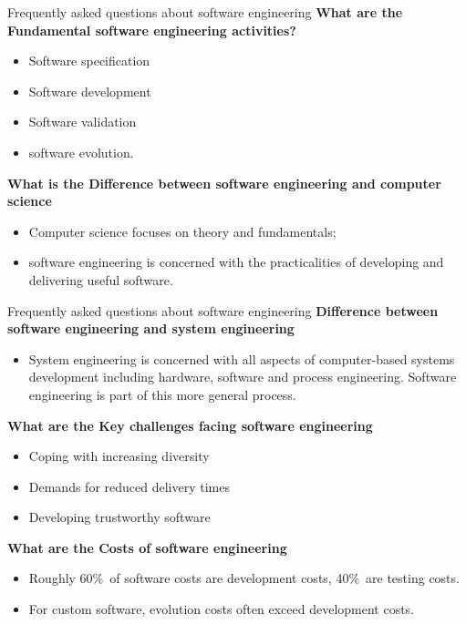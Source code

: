 \documentclass{beamer}
\begin{document}
\begin{frame}{Frequently 
		asked questions about 
		software engineering}
\textbf{What are the Fundamental software 
	engineering activities?}
\begin{itemize}
	\item Software specification
	\item Software development 
	\item Software validation 
	\item software evolution.
\end{itemize}
\textbf{What is the Difference between software 
	engineering and computer science}
\begin{itemize}
	\item Computer science focuses on theory and 
	fundamentals; 
	\item software engineering is 
	concerned with the practicalities of 
	developing and delivering useful 
	software.
\end{itemize}
\end{frame}
\begin{frame}{Frequently 
		asked questions about 
		software engineering}
\textbf{Difference between software 
	engineering and system engineering}
\begin{itemize}
	\item System engineering is concerned with all 
	aspects of computer-based systems 
	development including hardware, 
	software and process engineering. 
	Software engineering is part of this more 
	general process.
	
\end{itemize}
\textbf{What are the Key challenges facing 
	software engineering}
\begin{itemize}
	\item Coping with increasing diversity
	\item Demands for reduced delivery times 
	\item Developing trustworthy software
\end{itemize}
\textbf{What are the Costs of software 
	engineering}
\begin{itemize}
	\item Roughly 60\%\  of software costs are 
	development costs, 40\%\  are testing costs. 
	\item For custom software, evolution costs 
	often exceed development costs.
\end{itemize}
\end{frame}
\end{document}
